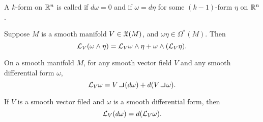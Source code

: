 \dfng A $k$-form on $\mathbb{R}^n$ is called  if $d\omega = 0$ and  if $\omega = d\eta$ for some $(k - 1)$-form $\eta$ on $\mathbb{R}^n$.

\setcounter{thm}{32}

\begin{prop}
Suppose $M$ is a smooth manifold $V\in \mathfrak{X}(M)$, and $\omega\eta\in\Omega^*(M)$. Then
\[\mathcal{L}_V(\omega\wedge\eta) = \mathcal{L}_V\omega\wedge\eta + \omega\wedge(\mathcal{L}_V\eta).\]
\end{prop}

\setcounter{thm}{34}

\begin{thm}
On a smooth manifold $M$, for any smooth vector field $V$ and any smooth differential form $\omega$,
\[\LL_V\omega = V\hook (d\omega) + d(V\hook \omega).\]
\end{thm}

\begin{cor}
If $V$ is a smooth vector filed and $\omega$ is a smooth differential form, then
\[\mathcal{L}_V(d\omega) = d(\mathcal{L}_V\omega).\]
\end{cor}

